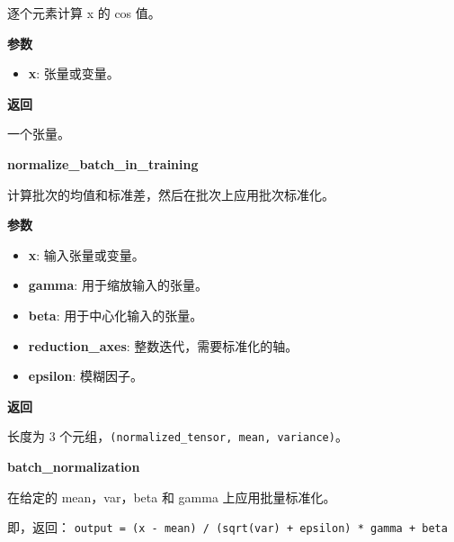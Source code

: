 逐个元素计算 x 的 cos 值。

\textbf{参数}

\begin{itemize}
\tightlist
\item
  \textbf{x}: 张量或变量。
\end{itemize}

\textbf{返回}

一个张量。


\textbf{normalize\_batch\_in\_training}\label{normalizeux5fbatchux5finux5ftraining}

\begin{Shaded}
\begin{Highlighting}[]
\OperatorTok{=}\NormalTok{)}
\end{Highlighting}
\end{Shaded}

计算批次的均值和标准差，然后在批次上应用批次标准化。

\textbf{参数}

\begin{itemize}
\tightlist
\item
  \textbf{x}: 输入张量或变量。
\item
  \textbf{gamma}: 用于缩放输入的张量。
\item
  \textbf{beta}: 用于中心化输入的张量。
\item
  \textbf{reduction\_axes}: 整数迭代，需要标准化的轴。
\item
  \textbf{epsilon}: 模糊因子。
\end{itemize}

\textbf{返回}

长度为 3 个元组，\texttt{(normalized\_tensor,\ mean,\ variance)}。


\textbf{batch\_normalization}\label{batchux5fnormalization}

\begin{Shaded}
\begin{Highlighting}[]
\OperatorTok{=}\NormalTok{)}
\end{Highlighting}
\end{Shaded}

在给定的 mean，var，beta 和 gamma 上应用批量标准化。

即，返回：
\texttt{output\ =\ (x\ -\ mean)\ /\ (sqrt(var)\ +\ epsilon)\ *\ gamma\ +\ beta}

